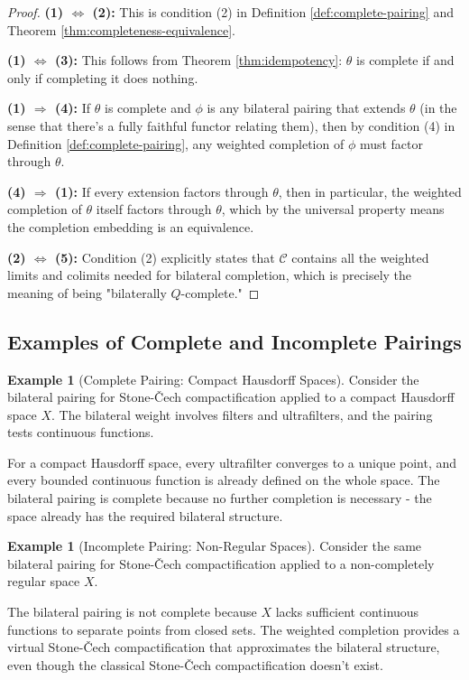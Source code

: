\documentclass[11pt]{article}
\theoremstyle{plain}
\theoremstyle{definition}
\newtheorem{example}[theorem]{Example}
\theoremstyle{remark}
\newcommand{\C}{\mathcal{C}}
\begin{document}
\begin{proof}
\textbf{(1) $\Leftrightarrow$ (2):} This is condition (2) in Definition \ref{def:complete-pairing} and Theorem \ref{thm:completeness-equivalence}.

\textbf{(1) $\Leftrightarrow$ (3):} This follows from Theorem \ref{thm:idempotency}: $\theta$ is complete if and only if completing it does nothing.

\textbf{(1) $\Rightarrow$ (4):} If $\theta$ is complete and $\phi$ is any bilateral pairing that extends $\theta$ (in the sense that there's a fully faithful functor relating them), then by condition (4) in Definition \ref{def:complete-pairing}, any weighted completion of $\phi$ must factor through $\theta$.

\textbf{(4) $\Rightarrow$ (1):} If every extension factors through $\theta$, then in particular, the weighted completion of $\theta$ itself factors through $\theta$, which by the universal property means the completion embedding is an equivalence.

\textbf{(2) $\Leftrightarrow$ (5):} Condition (2) explicitly states that $\C$ contains all the weighted limits and colimits needed for bilateral completion, which is precisely the meaning of being "bilaterally $Q$-complete."
\end{proof}

\subsection{Examples of Complete and Incomplete Pairings}

\begin{example}[Complete Pairing: Compact Hausdorff Spaces]
Consider the bilateral pairing for Stone-\v{C}ech compactification applied to a compact Hausdorff space $X$. The bilateral weight involves filters and ultrafilters, and the pairing tests continuous functions.

For a compact Hausdorff space, every ultrafilter converges to a unique point, and every bounded continuous function is already defined on the whole space. The bilateral pairing is complete because no further completion is necessary - the space already has the required bilateral structure.
\end{example}

\begin{example}[Incomplete Pairing: Non-Regular Spaces]
Consider the same bilateral pairing for Stone-\v{C}ech compactification applied to a non-completely regular space $X$. 

The bilateral pairing is not complete because $X$ lacks sufficient continuous functions to separate points from closed sets. The weighted completion provides a virtual Stone-\v{C}ech compactification that approximates the bilateral structure, even though the classical Stone-\v{C}ech compactification doesn't exist.
\end{example}
\end{document}
